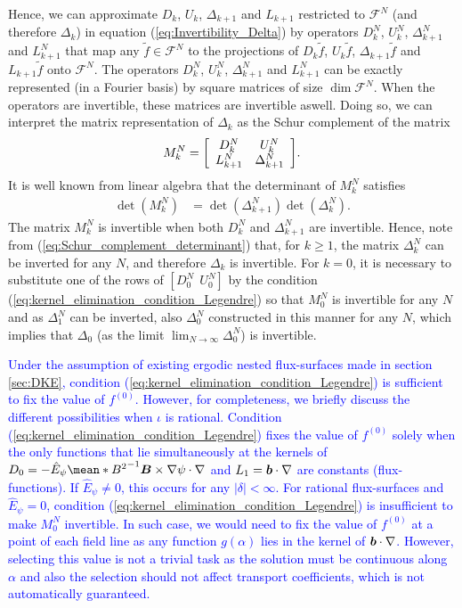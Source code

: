  
 Hence, we can approximate $D_k$, $U_k$, $\Delta_{k+1}$ and $L_{k+1} $ restricted to $\mathcal{F}^{N}$ (and therefore $\Delta_{k}$) in equation (\ref{eq:Invertibility_Delta}) by operators $D_k^N$, $U_k^N$, $\Delta_{k+1}^N$ and $L_{k+1}^N$ that map any $\tilde{f}\in\mathcal{F}^N$ to the projections of $D_k \tilde{f}$, $U_k \tilde{f}$, $\Delta_{k+1} \tilde{f}$ and $L_{k+1} \tilde{f}$ onto $\mathcal{F}^N$. The operators $D_k^N$, $U_k^N$, $\Delta_{k+1}^N$ and $L_{k+1}^N$ can be exactly represented (in a Fourier basis) by square matrices of size $\dim \mathcal{F}^N$. When the operators are invertible, these matrices are invertible aswell. Doing so, we can interpret the matrix representation of $\Delta_{k}$ as the Schur complement of the matrix
%
\begin{align}
	M_k^N = 
	\Matrix{cc}
	{ D_k^N & U_k^N \\
		L_{k+1}^N & \Delta_{k+1}^N
	}.
	\label{eq:Invertibility_Delta_Schur}
\end{align}
It is well known from linear algebra that the determinant of $M_k^N$ satisfies
%
\begin{align}
	\det(M_k^N)
	& =
	\det(\Delta_{k+1}^N)
	\det(\Delta_k^N)
	.
	\label{eq:Schur_complement_determinant}
\end{align}
%
The matrix $M_k^N$ is invertible when both $D_k^N$ and $\Delta_{k+1}^N$ are invertible. Hence, note from (\ref{eq:Schur_complement_determinant}) that, for $k\ge1$, the matrix $\Delta_{k}^N$ can be inverted for any $N$, and therefore $\Delta_{k}$ is invertible. For $k=0$, it is necessary to substitute one of the rows of $[D_0^N \ \ U_0^N]$ by the condition (\ref{eq:kernel_elimination_condition_Legendre}) so that $M_0^N$ is invertible for any $N$ and as $\Delta_1^N$ can be inverted, also $\Delta_0^N$ constructed in this manner for any $N$, which implies that $\Delta_0$ (as the limit $\lim_{N\rightarrow\infty} \Delta_0^N$) is invertible. 

\textcolor{blue}{Under the assumption of existing ergodic nested flux-surfaces made in section \ref{sec:DKE}, condition (\ref{eq:kernel_elimination_condition_Legendre}) is sufficient to fix the value of $f^{(0)}$. However, for completeness, we briefly discuss the different possibilities when $\iota$ is rational. Condition (\ref{eq:kernel_elimination_condition_Legendre}) fixes the value of $f^{(0)}$ solely when the only functions that lie simultaneously at the kernels of $D_0 = -\hat{E}_\psi \mean*{B^2}^{-1} \vb*{B}\times\nabla\psi\cdot\nabla$ and $L_1=\vb*{b}\cdot\nabla$ are constants (flux-functions). If $\hat{E}_\psi \ne 0$, this occurs for any $|\delta|<\infty $. For rational flux-surfaces and $\hat{E}_\psi = 0$, condition (\ref{eq:kernel_elimination_condition_Legendre}) is insufficient to make $M_0^N$ invertible. In such case, we would need to fix the value of $f^{(0)}$ at a point of each field line as any function $g(\alpha)$ lies in the kernel of $\vb*{b}\cdot\nabla$. However, selecting this value is not a trivial task as the solution must be continuous along $\alpha$ and also the selection should not affect transport coefficients, which is not automatically guaranteed. }